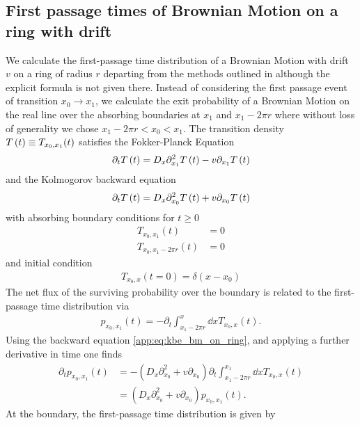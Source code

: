 \documentclass[%
 reprint,
superscriptaddress,
nofootinbib,
 amsmath,amssymb,
 aps,
prx,
]{revtex4-2}
\begin{document}
\begin{widetext}
\section{First passage times of Brownian Motion on a ring with drift}
\label{app:bm_with_drift}
We calculate the first-passage time distribution of a Brownian Motion with drift $v$ on a ring of radius $r$  departing from the methods outlined in \cite[Chp. V]{Cox1965} although the explicit formula is not given there. Instead of considering the first passage event of transition $x_0 \to x_1$, we calculate the exit probability of a Brownian Motion on the real line over the absorbing boundaries at $x_1$ and $x_1 - 2\pi r$ where without loss of generality we chose $x_1 - 2\pi r < x_0 < x_1$. The transition density $T\left(t\right) \equiv T_{x_0, x_1}( t)$ satisfies the Fokker-Planck Equation
\begin{align}
	\partial_t T\left(t\right) = D_x\partial_{x_1}^2T\left(t\right) - v \partial_{x_1} T\left(t\right)
	\label{app:eq:fpe_bm_on_ring}
\end{align}
and the Kolmogorov backward equation
\begin{align}
	\partial_t T\left(t\right) = D_x\partial_{x_0}^2T\left(t\right) + v \partial_{x_0} T\left(t\right)
	\label{app:eq:kbe_bm_on_ring}
\end{align}
with absorbing boundary conditions for $t\geq0$
\begin{align}
	T_{x_0,x_1}( t) &= 0\\
	T_{x_0, x_1-2\pi r}(t) &= 0
\end{align}
and initial condition
\begin{align}
	T_{x_0, x}(  t=0) = \delta(x - x_0)
	\label{}
\end{align}
The net flux of the surviving probability over the boundary is related to the first-passage time distribution via
\begin{align}
 p_{x_0, x_1}( t) = -\partial_t \int_{x_1 - 2\pi r}^{x} \dd{x} T_{x_0,x}(t).
\end{align}
Using the backward equation \eqref{app:eq:kbe_bm_on_ring}, and applying a further derivative in time one finds
\begin{align}
\partial_t  p_{x_0, x_1}( t) &= - (D_x \partial_{x_0}^2 + v \partial_{x_0})  \partial_t  \int_{x_1 - 2\pi r}^{x_1}\dd{x} T_{x_0,x}(t) \\
&=(D_x \partial_{x_0}^2 + v \partial_{x_0})p_{x_0, x_1}( t) . \label{appeq:fpt_laplace1}
\end{align}
At the boundary, the first-passage time distribution is given by

\end{widetext}
\end{document}
